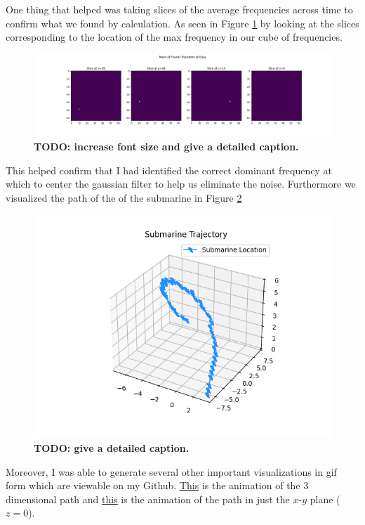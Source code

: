 \documentclass[11pt]{amsart}
\begin{document}
\noindent
One thing that helped was taking slices of the average frequencies across time to confirm what we found by calculation.
As seen in Figure \ref{fig:f1} by looking at the slices corresponding to the location of the max frequency in our cube of frequencies.

\begin{figure}[h]
	\centering
	\includegraphics[width=1\textwidth]{../visualizations/visualizing_dominant_frequency.png}
 	\caption{\textbf{TODO: increase font size and give a detailed caption.}}\label{fig:f1}
\end{figure}

This helped confirm that I had identified the correct dominant frequency at which to center the gaussian filter to help us eliminate the noise.
Furthermore we visualized the path of the of the submarine in Figure \ref{fig:f2}

\begin{figure}[h]
	\centering
	\includegraphics[width=1\textwidth]{../visualizations/submarine_static_3d.png}
 	\caption{\textbf{TODO: give a detailed caption.}}\label{fig:f2}
\end{figure}

Moreover, I was able to generate several other important visualizations in gif form which are viewable on my Github.
\href{https://github.com/hunter-lybbert/uw-central/blob/data-analysis-hw-1/data_analysis/hw_01/visualizations/submarine_trajectory_3d.gif}{This} is the animation of the 3 dimensional path and \href{https://github.com/hunter-lybbert/uw-central/blob/data-analysis-hw-1/data_analysis/hw_01/visualizations/submarine_trajectory_2d.gif}{this} is the animation of the path in just the $x$-$y$ plane ($z = 0$).
\end{document}

